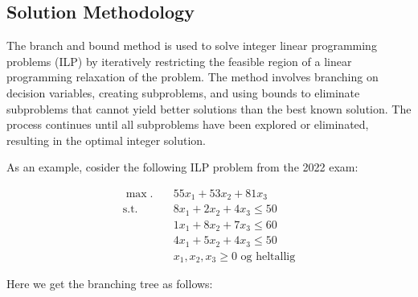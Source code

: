 \subsection{Solution Methodology}
The branch and bound method is used to solve integer linear programming problems (ILP) by iteratively restricting the feasible region of a linear programming relaxation of the problem. The method involves branching on decision variables, creating subproblems, and using bounds to eliminate subproblems that cannot yield better solutions than the best known solution. The process continues until all subproblems have been explored or eliminated, resulting in the optimal integer solution.

As an example, cosider the following ILP problem from the 2022 exam:

\begin{align*}
    \max. \quad & 55x_1 + 53x_2 + 81x_3 \\
    \text{s.t.} \quad & 8x_1 + 2x_2 + 4x_3 \le 50 \\
    & 1x_1 + 8x_2 + 7x_3 \le 60 \\
    & 4x_1 + 5x_2 + 4x_3 \le 50 \\
    & x_1, x_2, x_3 \ge 0 \text{ og heltallig}
\end{align*}

Here we get the branching tree as follows:

